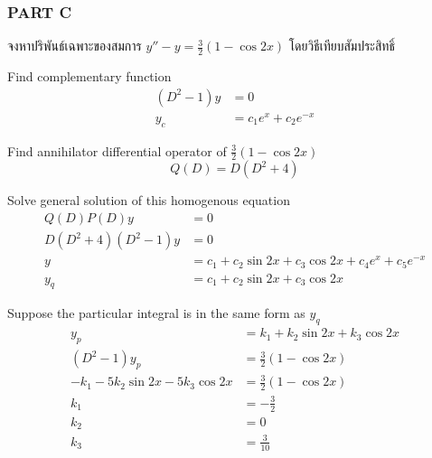 \documentclass[12pt,final]{novelette} %
\begin{document}
\pagebreak

\subsubsection*{PART C}

\begin{question}[resume]
    \item {}
    จงหาปริพันธ์เฉพาะของสมการ $y'' - y = \frac32(1-\cos2x)$ โดยวิธีเทียบสัมประสิทธิ์ 

    \bigskip
    Find complementary function
    \begin{align*}
        (D^2-1) y & = 0                      \\
        y_c       & = c_1 e^{x} + c_2 e^{-x}
    \end{align*}

    Find annihilator differential operator of $\frac32 (1 - \cos 2x)$
    $$
        Q(D) = D(D^2 + 4)
    $$

    Solve general solution of this homogenous equation
    \begin{align*}
        Q(D)P(D) y        & = 0                                                      \\
        D(D^2+4)(D^2-1) y & = 0                                                      \\
        y                 & = c_1 + c_2 \sin 2x + c_3 \cos 2x + c_4 e^x + c_5 e^{-x} \\
        y_q               & = c_1 + c_2 \sin 2x + c_3 \cos 2x
    \end{align*}

    Suppose the particular integral is in the same form as $y_q$
    \begin{align*}
        y_p                                 & = k_1 + k_2 \sin 2x + k_3 \cos 2x \\
        (D^2-1)y_p                          & = \frac32 (1 - \cos 2x)           \\
        -k_1 - 5 k_2\sin 2x - 5 k_3 \cos 2x & = \frac32 (1 - \cos 2x)           \\
        k_1                                 & = -\frac{3}{2}                    \\
        k_2                                 & = 0                               \\
        k_3                                 & = \frac{3}{10}
    \end{align*}


\end{question}
\end{document}
